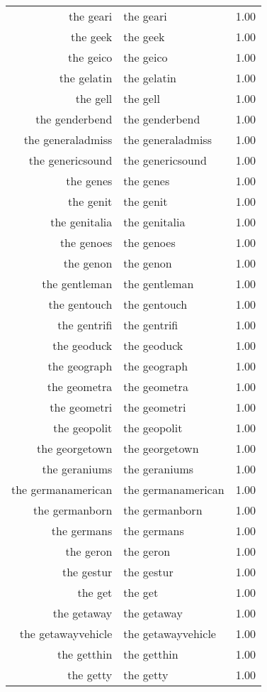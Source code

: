 \begin{table}[ht]
\begin{tabular}{rlr}
  the geari & the geari & 1.00 \\ 
  the geek & the geek & 1.00 \\ 
  the geico & the geico & 1.00 \\ 
  the gelatin & the gelatin & 1.00 \\ 
  the gell & the gell & 1.00 \\ 
  the genderbend & the genderbend & 1.00 \\ 
  the generaladmiss & the generaladmiss & 1.00 \\ 
  the genericsound & the genericsound & 1.00 \\ 
  the genes & the genes & 1.00 \\ 
  the genit & the genit & 1.00 \\ 
  the genitalia & the genitalia & 1.00 \\ 
  the genoes & the genoes & 1.00 \\ 
  the genon & the genon & 1.00 \\ 
  the gentleman & the gentleman & 1.00 \\ 
  the gentouch & the gentouch & 1.00 \\ 
  the gentrifi & the gentrifi & 1.00 \\ 
  the geoduck & the geoduck & 1.00 \\ 
  the geograph & the geograph & 1.00 \\ 
  the geometra & the geometra & 1.00 \\ 
  the geometri & the geometri & 1.00 \\ 
  the geopolit & the geopolit & 1.00 \\ 
  the georgetown & the georgetown & 1.00 \\ 
  the geraniums & the geraniums & 1.00 \\ 
  the germanamerican & the germanamerican & 1.00 \\ 
  the germanborn & the germanborn & 1.00 \\ 
  the germans & the germans & 1.00 \\ 
  the geron & the geron & 1.00 \\ 
  the gestur & the gestur & 1.00 \\ 
  the get & the get & 1.00 \\ 
  the getaway & the getaway & 1.00 \\ 
  the getawayvehicle & the getawayvehicle & 1.00 \\ 
  the getthin & the getthin & 1.00 \\ 
  the getty & the getty & 1.00 \\ 

\end{tabular}
\end{table}
